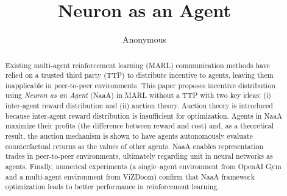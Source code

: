 \documentclass{article} %
\title{Neuron as an Agent}
\author{Anonymous}
\begin{document}
\maketitle

\begin{abstract}
Existing multi-agent reinforcement learning (MARL) communication methods have relied on a trusted third party (TTP) to distribute incentive to agents, leaving them inapplicable in peer-to-peer environments. This paper proposes incentive distribution using {\em Neuron as an Agent} (NaaA) in MARL without a TTP with two key ideas: (i) inter-agent reward distribution and (ii) auction theory. Auction theory is introduced because inter-agent reward distribution is insufficient for optimization. Agents in NaaA maximize their profits (the difference between reward and cost) and, as a theoretical result, the auction mechanism is shown to have agents autonomously evaluate counterfactual returns as the values of other agents. NaaA enables representation trades in peer-to-peer environments, ultimately regarding unit in neural networks as agents. Finally, numerical experiments (a single--agent environment from OpenAI Gym and a multi-agent environment from ViZDoom) confirm that NaaA framework optimization leads to better performance in reinforcement learning.
\end{abstract}











\end{document}

